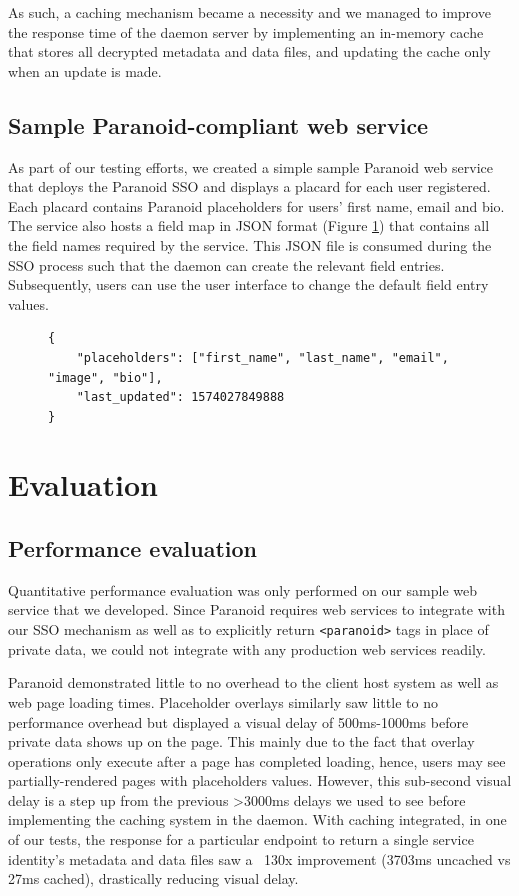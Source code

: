 \documentclass[letterpaper,twocolumn,10pt]{article}
\begin{document}
As such, a caching mechanism became a necessity and we managed to improve the response time of the daemon server by implementing an in-memory cache that stores all decrypted metadata and data files, and updating the cache only when an update is made.

\subsection{Sample Paranoid-compliant web service}

As part of our testing efforts, we created a simple sample Paranoid web service that deploys the Paranoid SSO and displays a placard for each user registered. Each placard contains Paranoid placeholders for users' first name, email and bio. The service also hosts a field map in JSON format (Figure \ref{fig:paranoid_map}) that contains all the field names required by the service. This JSON file is consumed during the SSO process such that the daemon can create the relevant field entries. Subsequently, users can use the user interface to change the default field entry values.

\begin{figure}
    \begin{lstlisting}
{
    "placeholders": ["first_name", "last_name", "email", "image", "bio"],
    "last_updated": 1574027849888
}
    \end{lstlisting}
    \label{fig:paranoid_map}
\end{figure}

\section{Evaluation}

\subsection{Performance evaluation}

Quantitative performance evaluation was only performed on our sample web service that we developed. Since Paranoid requires web services to integrate with our SSO mechanism as well as to explicitly return \texttt{<paranoid>} tags in place of private data, we could not integrate with any production web services readily.

Paranoid demonstrated little to no overhead to the client host system as well as web page loading times. Placeholder overlays similarly saw little to no performance overhead but displayed a visual delay of 500ms-1000ms before private data shows up on the page. This mainly due to the fact that overlay operations only execute after a page has completed loading, hence, users may see partially-rendered pages with placeholders values. However, this sub-second visual delay is a step up from the previous >3000ms delays we used to see before implementing the caching system in the daemon. With caching integrated, in one of our tests, the response for a particular endpoint to return a single service identity's metadata and data files saw a ~130x improvement (3703ms uncached vs 27ms cached), drastically reducing visual delay.
\end{document}
